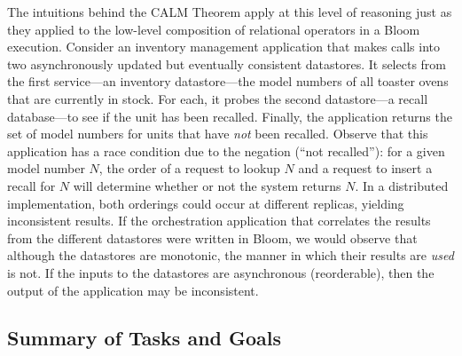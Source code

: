 The intuitions behind the CALM Theorem apply at this level of reasoning
just as they applied to the low-level composition of relational operators
in a Bloom execution.  Consider an inventory management application 
that makes calls into two asynchronously updated but
eventually consistent datastores.  It selects from the first service---an 
inventory datastore---the model numbers of all toaster ovens that are currently in stock.  For each, it probes the second datastore---a recall database---to
see if the unit has been recalled.  Finally, the application returns the 
set of model numbers for units that have \emph{not} been recalled.  Observe that this
application has a race condition due to the negation (``not recalled''): for a given model number $N$, the order of a request to lookup $N$ and a request to insert a recall for $N$ will determine whether or not the system returns $N$.  In a distributed implementation, both orderings could occur at different replicas, yielding inconsistent results.  If the orchestration
application that correlates the results from the different datastores were written in Bloom, we would observe that although the datastores are monotonic, 
the manner in which their results are \emph{used} is not.  If the inputs to 
the datastores are asynchronous (reorderable), then the output of the 
application may be inconsistent.


\subsection{Summary of Tasks and Goals}


